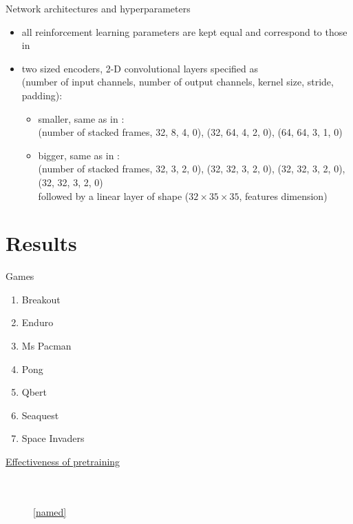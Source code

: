 \documentclass{beamer}
\begin{document}
\begin{frame}{Network architectures and hyperparameters}
\begin{itemize}
\item all reinforcement learning parameters are kept equal and correspond 
		to those in \cite{rainbow}
\item two sized encoders, 2-D convolutional layers specified as\\
		(number of input channels, number of output
channels, kernel size, stride, padding):
		\begin{itemize}
				\item smaller, same as in \cite{mnih2015humanlevel}: \\
(number of stacked frames, 32, 8, 4, 0), (32, 64, 4, 2, 0), (64, 64, 3, 1, 0)
\item bigger, same as in \cite{sac+ae}:\\
(number of stacked frames, 32, 3, 2, 0), 
(32, 32, 3, 2, 0),
(32, 32, 3, 2, 0),
(32, 32, 3, 2, 0) \\
followed by a linear layer of shape ($32 \times 35 \times 35$, features dimension)
		\end{itemize}
\end{itemize}
\end{frame}

\section{Results}

\begin{frame}{Games}
\begin{enumerate}
		\item Breakout
		\item Enduro
		\item Ms Pacman
		\item Pong
		\item Qbert
		\item Seaquest
		\item Space Invaders
\end{enumerate}
\end{frame}


\begin{frame}[plain]
		\centering
		\underline{Effectiveness of pretraining}
		\vspace{-1cm}
\begin{figure}[!t]
  \captionsetup[subfloat]{position=top,labelformat=empty}
  \centering
    \subfloat[]{  \resizebox{0.4\textwidth}{!}{}}
    \subfloat[]{  \resizebox{0.4\textwidth}{!}{}}\\
  \vspace{-1cm}
    \subfloat[]{  \resizebox{0.4\textwidth}{!}{}}
    \subfloat[]{  \resizebox{0.4\textwidth}{!}{}}\\
    \ref{named}
\end{figure}
\end{frame}
\end{document}
